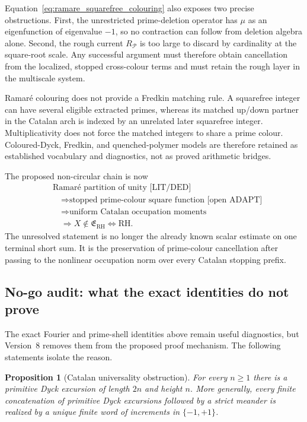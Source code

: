 \documentclass[11pt]{amsart}
\numberwithin{equation}{section}
\theoremstyle{plain}
\newtheorem{proposition}[theorem]{Proposition}
\theoremstyle{definition}
\theoremstyle{remark}
\newcommand{\Mob}{\mu}
\begin{document}
Equation~\eqref{eq:ramare_squarefree_colouring} also exposes two precise
obstructions.  First, the unrestricted prime-deletion operator has
$\Mob$ as an eigenfunction of eigenvalue $-1$, so no contraction can follow
from deletion algebra alone.  Second, the rough current $R_{\mathcal P}$ is
too large to discard by cardinality at the square-root scale.  Any successful
argument must therefore obtain cancellation from the localized, stopped
cross-colour terms and must retain the rough layer in the multiscale system.

Ramar\'e colouring does not provide a Fredkin matching rule.  A squarefree
integer can have several eligible extracted primes, whereas its matched
up/down partner in the Catalan arch is indexed by an unrelated later
squarefree integer.  Multiplicativity does not force the matched integers to
share a prime colour.  Coloured-Dyck, Fredkin, and quenched-polymer models are
therefore retained as established vocabulary and diagnostics, not as proved
arithmetic bridges.

The proposed non-circular chain is now
\begin{equation}
\begin{split}
&\text{Ramar\'e partition of unity [LIT/DED]}\\
&\quad\Longrightarrow
\text{stopped prime-colour square function [open ADAPT]}\\
&\quad\Longrightarrow
\text{uniform Catalan occupation moments}\\
&\quad\Longrightarrow
X\notin\mathfrak E_{\mathrm{RH}}
\Longleftrightarrow\mathrm{RH}.
\end{split}
\label{eq:ramare_catalan_chain}
\end{equation}
The unresolved statement is no longer the already known scalar estimate on
one terminal short sum.  It is the preservation of prime-colour cancellation
after passing to the nonlinear occupation norm over every Catalan stopping
prefix.

\subsection{No-go audit: what the exact identities do not prove}

The exact Fourier and prime-shell identities above remain useful diagnostics,
but Version~8 removes them from the proposed proof mechanism.  The following
statements isolate the reason.

\begin{proposition}[Catalan universality obstruction]
\label{prop:catalan_universality_obstruction}
For every $n\geq1$ there is a primitive Dyck excursion of length $2n$ and
height $n$.  More generally, every finite concatenation of primitive Dyck
excursions followed by a strict meander is realized by a unique finite word
of increments in $\{-1,+1\}$.
\end{proposition}
\end{document}
